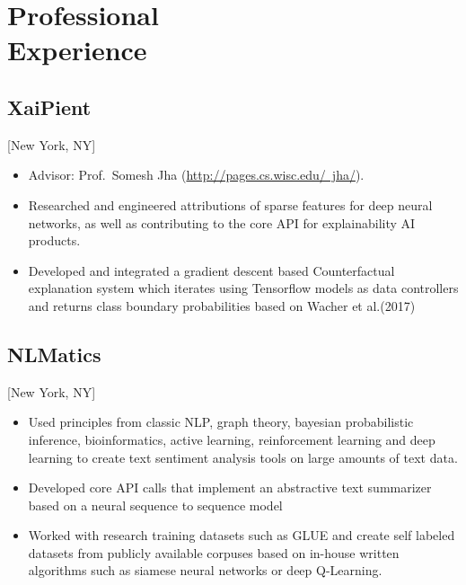 \documentclass{rkim-resume}
\begin{document}
\maketitle%

\section{Professional \\ Experience}

\subsection{XaiPient}[New York, NY]
\begin{positions}
\end{positions}

\begin{itemize}
  \item Advisor: Prof.~Somesh Jha (\href{http://pages.cs.wisc.edu/~jha/}{http://pages.cs.wisc.edu/~jha/}).
  \item Researched and engineered attributions of sparse features for deep neural networks, as well as contributing to the core API for explainability AI products.
  \item Developed and integrated a gradient descent based Counterfactual explanation system which iterates using Tensorflow models as data controllers and returns class boundary probabilities based on Wacher et al.(2017)
\end{itemize}

\subsection{NLMatics}[New York, NY]
\begin{positions}
\end{positions}

\begin{itemize}
  \item Used principles from classic NLP, graph theory, bayesian probabilistic inference, bioinformatics, active learning, reinforcement learning and deep learning to create text sentiment analysis tools on large amounts of text data.
  \item Developed core API calls that implement an abstractive text summarizer based on a neural sequence to sequence model
  \item Worked with research training datasets such as GLUE and create self labeled datasets from publicly available corpuses based on in-house written algorithms such as siamese neural networks or deep Q-Learning.
\end{itemize}
\end{document}
